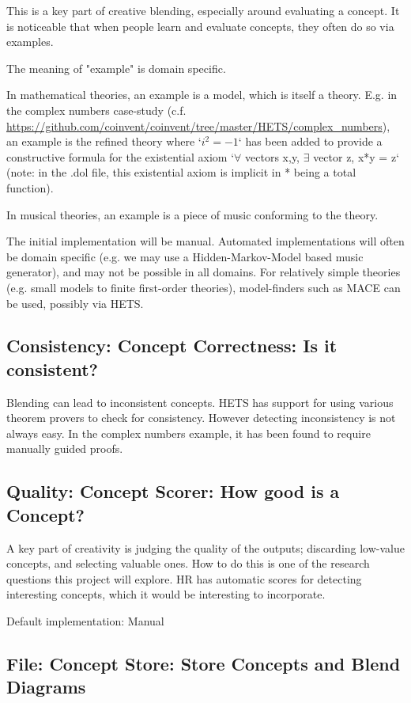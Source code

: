 \documentclass[10pt]{article}
\begin{document}
This is a key part of creative blending, especially around evaluating a concept. 
It is noticeable that when people learn and evaluate concepts, they often do so via examples.

The meaning of "example" is domain specific.

In mathematical theories, an example is a model, which is itself a theory. 
E.g. in the complex numbers case-study (c.f. \url{https://github.com/coinvent/coinvent/tree/master/HETS/complex_numbers}), 
an example is the refined theory where `$i^2 = -1$` has been added to provide a constructive formula for the existential
axiom `$\forall$ vectors x,y, $\exists$ vector z, x*y = z` (note: in the .dol file, this existential axiom is 
implicit in * being a total function).
 
In musical theories, an example is a piece of music conforming to the theory.
 
The initial implementation will be manual. Automated implementations will often be domain specific (e.g. we may use a Hidden-Markov-Model based music generator), and may not be possible in all domains.
For relatively simple theories (e.g. small models to finite first-order theories), model-finders such as MACE can be used, possibly via HETS.


\subsection{Consistency: Concept Correctness: Is it consistent?}

Blending can lead to inconsistent concepts. HETS has support for using various theorem provers to check for consistency. However detecting inconsistency is not always
easy. In the complex numbers example, it has been found to require manually guided
proofs.

\subsection{Quality: Concept Scorer: How good is a Concept?}


A key part of creativity is judging the quality of the outputs; discarding
low-value concepts, and selecting valuable ones. How to do this is one of the research questions this project will explore. HR has automatic scores for detecting interesting concepts, which it would be interesting to incorporate.

Default implementation: Manual

\subsection{File: Concept Store: Store Concepts and Blend Diagrams}
\end{document}
